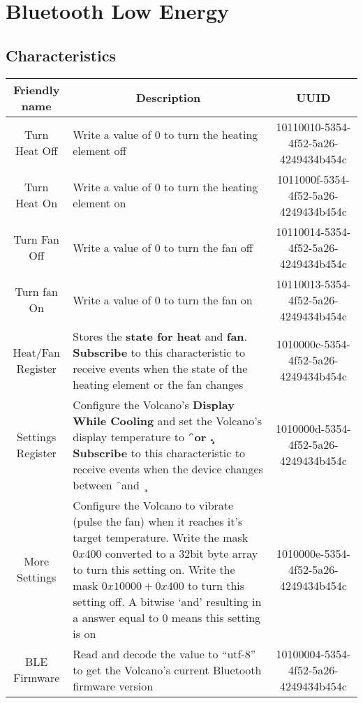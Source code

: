 \chapter{Bluetooth Low Energy}
\section{Characteristics}
\begin{longtable}{c|p{2.1in}|c}
\textbf{Friendly name} & \multicolumn{1}{|c|}{\textbf{Description}} & \textbf{UUID} \\ \hline

Turn Heat Off&
Write a value of 0 to turn the heating element off&
10110010-5354-4f52-5a26-4249434b454c \\ \hline

Turn Heat On&
Write a value of 0 to turn the heating element on&
1011000f-5354-4f52-5a26-4249434b454c \\ \hline

Turn Fan Off &
Write a value of 0 to turn the fan off &
10110014-5354-4f52-5a26-4249434b454c\\ \hline

Turn fan On&
Write a value of 0 to turn the fan on &
10110013-5354-4f52-5a26-4249434b454c\\ \hline

Heat/Fan Register&
Stores the \textbf{state for heat} and \textbf{fan}.
\textbf{Subscribe} to this characteristic to receive events
when the state of the heating element or the fan changes&
1010000c-5354-4f52-5a26-4249434b454c \\ \hline 

Settings Register&
Configure the Volcano's \textbf{Display While Cooling} and
set the Volcano's display temperature to \textbf{\f\ or \c.}
\textbf{Subscribe} to this characteristic to receive events
when the device changes between \f\ and \c\ &
 1010000d-5354-4f52-5a26-4249434b454c \\ \hline

More Settings&
Configure the Volcano to vibrate (pulse the fan) when it reaches it's target temperature. 
Write the mask $0x400$ converted to a 32bit byte array to turn this setting on. 
Write the mask $0x10000 + 0x400$ to turn this setting off. 
A bitwise `and' resulting in a answer equal to 0 means this setting is on&
1010000e-5354-4f52-5a26-4249434b454c \\ \hline

BLE Firmware&
Read and decode the value to ``utf-8'' to get the Volcano's current Bluetooth firmware version&
10100004-5354-4f52-5a26-4249434b454c\\ \hline


\end{longtable}
